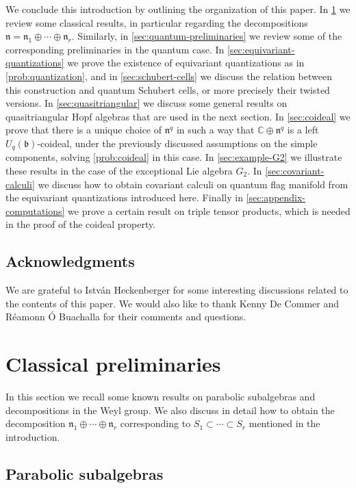 \documentclass[a4paper, 12pt, reqno, english]{amsart}
\numberwithin{equation}{section}
\numberwithin{figure}{section}
\theoremstyle{plain}
\theoremstyle{plain}
\theoremstyle{plain}
\theoremstyle{plain}
\theoremstyle{plain}
\theoremstyle{definition}
\theoremstyle{definition}
\theoremstyle{definition}
\theoremstyle{remark}
\theoremstyle{definition}
\theoremstyle{definition}
\newcommand{\Uqb}{U_q(\mathfrak{b})}
\newcommand{\bbC}{\mathbb{C}}
\newcommand{\lien}{\mathfrak{n}}
\newcommand{\qnil}{\lien^q}
\begin{document}
We conclude this introduction by outlining the organization of this paper.
In \cref{sec:classical-preliminaries} we review some classical results, in particular regarding the decompositions $\lien = \lien_1 \oplus \cdots \oplus \lien_r$.
Similarly, in \cref{sec:quantum-preliminaries} we review some of the corresponding preliminaries in the quantum case.
In \cref{sec:equivariant-quantizations} we prove the existence of equivariant quantizations as in \cref{prob:quantization}, and in \cref{sec:schubert-cells} we discuss the relation between this construction and quantum Schubert cells, or more precisely their twisted versions.
In \cref{sec:quasitriangular} we discuss some general results on quasitriangular Hopf algebras that are used in the next section.
In \cref{sec:coideal} we prove that there is a unique choice of $\qnil$ in such a way that $\bbC \oplus \qnil$ is a left $\Uqb$-coideal, under the previously discussed assumptions on the simple components, solving \cref{prob:coideal} in this case.
In \cref{sec:example-G2} we illustrate these results in the case of the exceptional Lie algebra $G_2$.
In \cref{sec:covariant-calculi} we discuss how to obtain covariant calculi on quantum flag manifold from the equivariant quantizations introduced here.
Finally in \cref{sec:appendix-computations} we prove a certain result on triple tensor products, which is needed in the proof of the coideal property.

\subsection*{Acknowledgments}

We are grateful to István Heckenberger for some interesting discussions related to the contents of this paper.
We would also like to thank Kenny De Commer and Réamonn Ó Buachalla for their comments and questions.

\section{Classical preliminaries}
\label{sec:classical-preliminaries}

In this section we recall some known results on parabolic subalgebras and decompositions in the Weyl group.
We also discuss in detail how to obtain the decomposition $\lien_1 \oplus \cdots \oplus \lien_r$ corresponding to $S_1 \subset \cdots \subset S_r$ mentioned in the introduction.

\subsection{Parabolic subalgebras}
\end{document}
